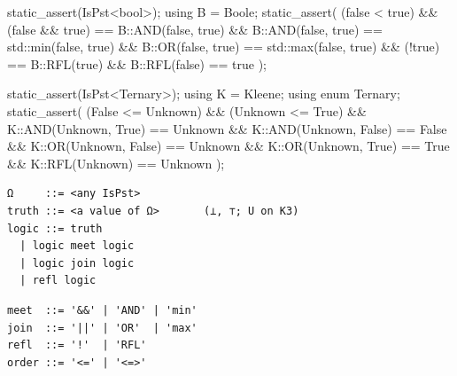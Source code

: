 \documentclass[11pt, a4paper]{article}
\begin{document}
\begin{listing}[ht]
\caption{\textbf{The answer-chain} $\Omega$, a bounded chain (Eqn.~\ref{eqn:pst}):  is a truth-object () whose values are totally ordered.
\textbf{Top left ($\mathbb{B}$):} the native operators, the species API //, and the lattice $\min/\max$ are one and the same operation; $\wedge/\vee = \min/\max$ on $\bot < \top$, and $\neg = $  is the reflection, a genuine complement only here.
\textbf{Top right ($\mathrm{K}_3$):} the undecided $U$ under the order.
$\bot \le U \le \top$; $U$ met with the \emph{identity} ($\top$ for $\wedge$, $\bot$ for $\vee$) stays $U$, but with the \emph{annihilator} ($\bot$ for $\wedge$, $\top$ for $\vee$) it collapses to a decided value ($U \wedge \bot = \bot$, $U \vee \top = \top$), so a $\forall/\exists$ fold stays undecided until a decisive endpoint appears; the order $\le$ (the meet-order $a \le b \Leftrightarrow a \wedge b = a$) later reifies as the subset test; and  fixes the centre ($\neg U = U$).
\textbf{Bottom:} the grammar of truth expressions, each operator spelled for  and for the general chain; the structure of the two panels is described above, so the code carries no inline commentary.}
\label{lst:membership}
\noindent
\begin{minipage}[t]{0.49\linewidth}
\begin{cpp}
static_assert(IsPst<bool>);
using B = Boole;
static_assert(
   (false < true)
&& (false && true) == B::AND(false, true)
&& B::AND(false, true) == std::min(false, true)
&& B::OR(false, true) == std::max(false, true)
&& (!true) == B::RFL(true)
&& B::RFL(false) == true
);
\end{cpp}
\end{minipage}\hfill
\begin{minipage}[t]{0.49\linewidth}
\begin{cpp}
static_assert(IsPst<Ternary>);
using K = Kleene; using enum Ternary;
static_assert(
   (False <= Unknown) && (Unknown <= True)
&& K::AND(Unknown, True)  == Unknown
&& K::AND(Unknown, False) == False
&& K::OR(Unknown, False)  == Unknown
&& K::OR(Unknown, True)   == True
&& K::RFL(Unknown) == Unknown
);
\end{cpp}
\end{minipage}

\vspace{0.6em}
\noindent
\begin{minipage}[t]{0.49\linewidth}
\begin{verbatim}
Ω     ::= <any IsPst>
truth ::= <a value of Ω>       (⊥, ⊤; U on K3)
logic ::= truth
  | logic meet logic
  | logic join logic
  | refl logic
\end{verbatim}
\end{minipage}\hfill
\begin{minipage}[t]{0.49\linewidth}
\begin{verbatim}
meet  ::= '&&' | 'AND' | 'min'
join  ::= '||' | 'OR'  | 'max'
refl  ::= '!'  | 'RFL'
order ::= '<=' | '<=>'
\end{verbatim}
\end{minipage}
\end{listing}
\end{document}
